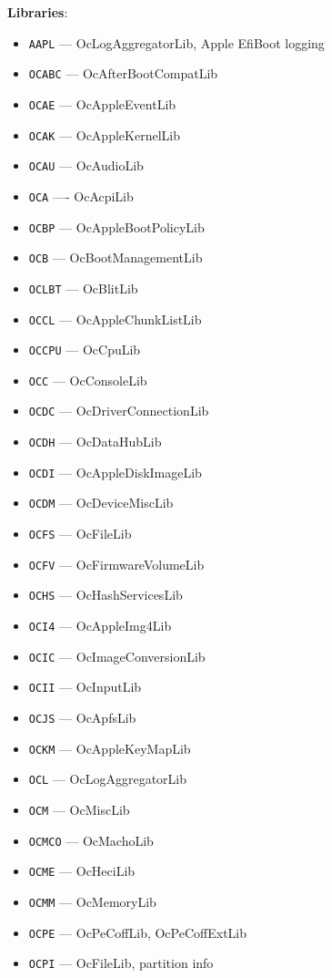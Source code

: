 \documentclass[]{article}
\makeatletter
\providecommand{\tightlist}{%
  \setlength{\itemsep}{0pt}\setlength{\parskip}{0pt}}
\renewcommand{\label}[1]{%
\zref@wrapper@immediate{\oldlabel{#1}}}  %
\makeatother
\begin{document}
\begin{enumerate}
  \label{oc-mod-libs}
  \textbf{Libraries}:
  \begin{itemize}
  \tightlist
  \item \texttt{AAPL} --- OcLogAggregatorLib, Apple EfiBoot logging
  \item \texttt{OCABC} --- OcAfterBootCompatLib
  \item \texttt{OCAE} --- OcAppleEventLib
  \item \texttt{OCAK} --- OcAppleKernelLib
  \item \texttt{OCAU} --- OcAudioLib
  \item \texttt{OCA} ---- OcAcpiLib
  \item \texttt{OCBP} --- OcAppleBootPolicyLib
  \item \texttt{OCB} --- OcBootManagementLib
  \item \texttt{OCLBT} --- OcBlitLib
  \item \texttt{OCCL} --- OcAppleChunkListLib
  \item \texttt{OCCPU} --- OcCpuLib
  \item \texttt{OCC} --- OcConsoleLib
  \item \texttt{OCDC} --- OcDriverConnectionLib
  \item \texttt{OCDH} --- OcDataHubLib
  \item \texttt{OCDI} --- OcAppleDiskImageLib
  \item \texttt{OCDM} --- OcDeviceMiscLib
  \item \texttt{OCFS} --- OcFileLib
  \item \texttt{OCFV} --- OcFirmwareVolumeLib
  \item \texttt{OCHS} --- OcHashServicesLib
  \item \texttt{OCI4} --- OcAppleImg4Lib
  \item \texttt{OCIC} --- OcImageConversionLib
  \item \texttt{OCII} --- OcInputLib
  \item \texttt{OCJS} --- OcApfsLib
  \item \texttt{OCKM} --- OcAppleKeyMapLib
  \item \texttt{OCL} --- OcLogAggregatorLib
  \item \texttt{OCM} --- OcMiscLib
  \item \texttt{OCMCO} --- OcMachoLib
  \item \texttt{OCME} --- OcHeciLib
  \item \texttt{OCMM} --- OcMemoryLib
  \item \texttt{OCPE} --- OcPeCoffLib, OcPeCoffExtLib
  \item \texttt{OCPI} --- OcFileLib, partition info

\end{itemize}
\end{enumerate}
\end{document}
